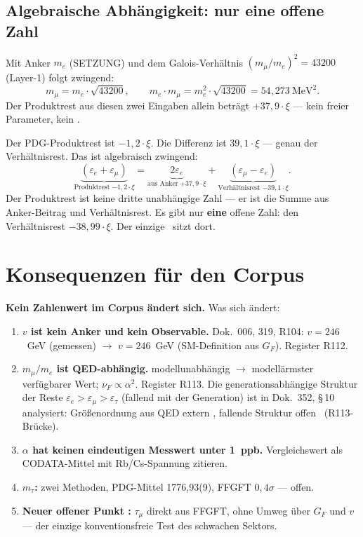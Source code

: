 \subsection*{Algebraische Abhängigkeit: nur eine offene Zahl}

Mit Anker $m_e$ (SETZUNG) und dem Galois-Verhältnis $(m_\mu/m_e)^2=43200$
(Layer-1) folgt zwingend:
\[
m_\mu = m_e\cdot\sqrt{43200},\qquad
m_e\cdot m_\mu = m_e^2\cdot\sqrt{43200} = 54{,}273~\text{MeV}^2.
\]
Der Produktrest aus diesen zwei Eingaben allein beträgt $+37{,}9\cdot\xi$
--- kein freier Parameter, kein \SM.

Der PDG-Produktrest ist $-1{,}2\cdot\xi$. Die Differenz ist
$39{,}1\cdot\xi$ --- genau der Verhältnisrest. Das ist algebraisch
zwingend:
\[
\underbrace{(\varepsilon_e+\varepsilon_\mu)}_{\text{Produktrest}\;{-1{,}2\cdot\xi}}
=
\underbrace{2\varepsilon_e}_{\text{aus Anker}\;{+37{,}9\cdot\xi}}
+
\underbrace{(\varepsilon_\mu-\varepsilon_e)}_{\text{Verhältnisrest}\;{-39{,}1\cdot\xi}}.
\]
Der Produktrest ist keine dritte unabhängige Zahl --- er ist die Summe
aus Anker-Beitrag und Verhältnisrest. Es gibt nur \textbf{eine} offene
Zahl: den Verhältnisrest $-38{,}99\cdot\xi$. Der einzige \SM\ sitzt dort.

\section{Konsequenzen für den Corpus}

\textbf{Kein Zahlenwert im Corpus ändert sich.} Was sich ändert:
\begin{enumerate}\itemsep2pt
\item \textbf{$v$ ist kein Anker und kein Observable.} Dok.~006, 319, R104: \glqq$v=246$~GeV (gemessen)\grqq{} $\to$ \glqq$v=246$~GeV (SM-Definition aus $G_F$)\grqq. Register R112.
\item \textbf{$m_\mu/m_e$ ist QED-abhängig.} \glqq modellunabhängig\grqq{} $\to$ \glqq modellärmster verfügbarer Wert\grqq; $\nu_F\propto\alpha^2$. Register R113.
  Die generationsabhängige Struktur der Reste $\varepsilon_e > \varepsilon_\mu > \varepsilon_\tau$
  (fallend mit der Generation) ist in Dok.~352, §\,10 analysiert: Größenordnung aus QED
  extern \QM, fallende Struktur offen \SM\ (R113-Brücke).
\item \textbf{$\alpha$ hat keinen eindeutigen Messwert unter 1~ppb.} Vergleichswert als CODATA-Mittel mit Rb/Cs-Spannung zitieren.
\item \textbf{$m_\tau$:} zwei Methoden, PDG-Mittel 1776{,}93(9), FFGFT $0{,}4\sigma$ --- offen.
\item \textbf{Neuer offener Punkt \SM:} $\tau_\mu$ direkt aus FFGFT, ohne Umweg über $G_F$ und $v$ --- der einzige konventionsfreie Test des schwachen Sektors.
\end{enumerate}

